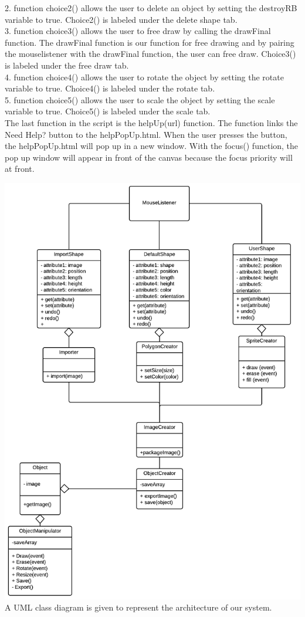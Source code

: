 \documentclass[a4paper, 11pt]{article} %
\begin{document}
2.	function choice2() allows the user to delete an object by setting the destroyRB variable to true. Choice2() is labeled under the delete shape tab.\\

3.	function choice3() allows the user to free draw by calling the drawFinal function. The drawFinal function is our function for free drawing and by pairing the mouselistener with the drawFinal function, the user can free draw. Choice3() is labeled under the free draw tab.\\

4.	function choice4() allows the user to rotate the object by setting the rotate variable to true. Choice4() is labeled under the rotate tab.\\

5.	function choice5() allows the user to scale the object by setting the scale variable to true. Choice5() is labeled under the scale tab.\\

The last function in the script is the helpUp(url) function. The function links the Need Help? button to the helpPopUp.html. When the user presses the button, the helpPopUp.html will pop up in a new window. With the focus() function, the pop up window will appear in front of the canvas because the focus priority will at front.


\includegraphics[scale=0.52]{ClassDiagramObjectModule}\\
A UML class diagram is given to represent the architecture of our system.\\
\end{document}
